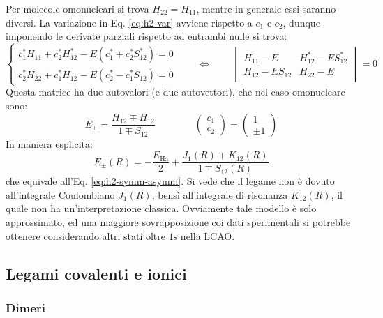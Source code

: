 Per molecole omonucleari si trova $ H_{22} = H_{11} $, mentre in generale essi saranno diversi.
La variazione in Eq. \ref{eq:h2-var} avviene rispetto a $ c_1 $ e $ c_2 $, dunque imponendo le derivate parziali rispetto ad entrambi nulle si trova:
\begin{equation*}
	\begin{cases}
		c_1^* H_{11} + c_2^* H_{12}^* - E (c_1^* + c_2^* S_{12}^*) = 0 \\
		c_2^* H_{22} + c_1^* H_{12} - E (c_2^* - c_1^* S_{12}) = 0
	\end{cases}
	\qquad \iff \qquad
	\begin{vmatrix}
		H_{11} - E & H_{12}^* - E S_{12}^* \\
		H_{12} - E S_{12} & H_{22} - E
	\end{vmatrix}
	= 0
\end{equation*}
Questa matrice ha due autovalori (e due autovettori), che nel caso omonucleare sono:
\begin{equation*}
	E_\pm = \frac{H_{12} \mp H_{12}}{1 \mp S_{12}}
	\qquad \qquad
	\begin{pmatrix}
		c_1 \\ c_2
	\end{pmatrix}
	=
	\begin{pmatrix}
		1 \\ \pm 1
	\end{pmatrix}
\end{equation*}
In maniera esplicita:
\begin{equation}
	E_\pm(R) = - \frac{E_\text{Ha}}{2} + \frac{J_{1}(R) \mp K_{12}(R)}{1 \mp S_{12}(R)}
\end{equation}
che equivale all'Eq. \ref{eq:h2-symm-asymm}. Si vede che il legame non è dovuto all'integrale Coulombiano $ J_1(R) $, bensì all'integrale di risonanza $ K_{12}(R) $, il quale non ha un'interpretazione classica. Ovviamente tale modello è solo approssimato, ed una maggiore sovrapposizione coi dati sperimentali si potrebbe ottenere considerando altri stati oltre $ \text{1s} $ nella LCAO.

\subsection{Legami covalenti e ionici}

\subsubsection{Dimeri}

